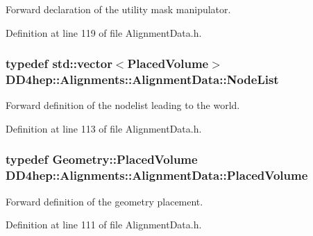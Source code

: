 Forward declaration of the utility mask manipulator. 

Definition at line 119 of file AlignmentData.h.\hypertarget{class_d_d4hep_1_1_alignments_1_1_alignment_data_a3a667fd798d7523d75accee832d64521}{
\subsubsection[{NodeList}]{\setlength{\rightskip}{0pt plus 5cm}typedef std::vector$<${\bf PlacedVolume}$>$ {\bf DD4hep::Alignments::AlignmentData::NodeList}}}
\label{class_d_d4hep_1_1_alignments_1_1_alignment_data_a3a667fd798d7523d75accee832d64521}


Forward definition of the nodelist leading to the world. 

Definition at line 113 of file AlignmentData.h.\hypertarget{class_d_d4hep_1_1_alignments_1_1_alignment_data_aab2d43f5a4a4c2163e0a04905306525a}{
\subsubsection[{PlacedVolume}]{\setlength{\rightskip}{0pt plus 5cm}typedef {\bf Geometry::PlacedVolume} {\bf DD4hep::Alignments::AlignmentData::PlacedVolume}}}
\label{class_d_d4hep_1_1_alignments_1_1_alignment_data_aab2d43f5a4a4c2163e0a04905306525a}


Forward definition of the geometry placement. 

Definition at line 111 of file AlignmentData.h.

